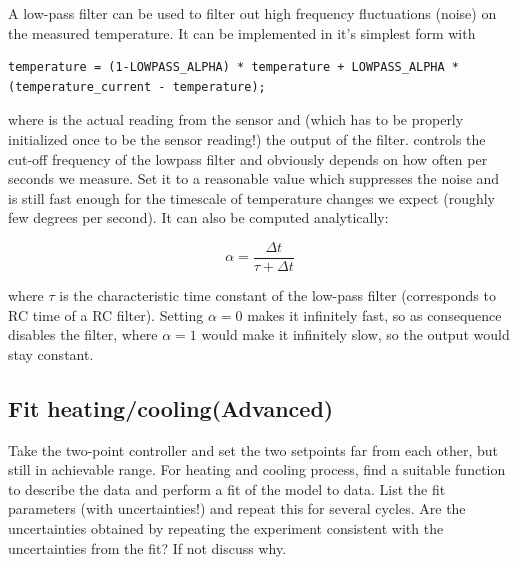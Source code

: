 A low-pass filter can be used to filter out high frequency fluctuations (noise) on the measured temperature. It can be implemented in it's simplest form with

\noindent\begin{minipage}{\textwidth}
\begin{lstlisting}[language=Arduino]
temperature = (1-LOWPASS_ALPHA) * temperature + LOWPASS_ALPHA * (temperature_current - temperature);
\end{lstlisting}
\end{minipage}

where  is the actual reading from the sensor and  (which has to be properly initialized once to be the sensor reading!) the output of the filter.  controls the cut-off frequency of the lowpass filter and obviously depends on how often per seconds we measure. Set it to a reasonable value which suppresses the noise and is still fast enough for the timescale of temperature changes we expect (roughly few degrees per second). It can also be computed analytically:

\begin{equation}
\alpha = \frac{\Delta t}{\tau + \Delta t}
\end{equation}

where $\tau$ is the characteristic time constant of the low-pass filter (corresponds to RC time of a RC filter). Setting $\alpha = 0$ makes it infinitely fast, so as consequence disables the filter, where $\alpha = 1$ would make it infinitely slow, so the output would stay constant.

\subsection{Fit heating/cooling(Advanced)}
Take the two-point controller and set the two setpoints far from each other, but still in achievable range. For heating and cooling process, find a suitable function to describe the data and perform a fit of the model to data. List the fit parameters (with uncertainties!) and repeat this for several cycles. Are the uncertainties obtained by repeating the experiment consistent with the uncertainties from the fit? If not discuss why.

